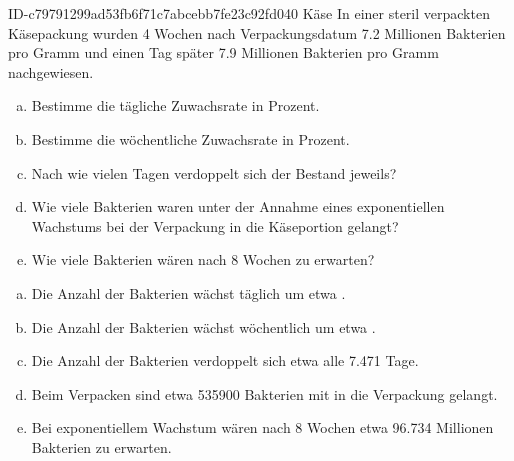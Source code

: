 \begin{exercise}
      {ID-c79791299ad53fb6f71c7abcebb7fe23c92fd040}
      {Käse}
  \ifproblem\problem
    In einer \glqq steril\grqq{} verpackten Käsepackung wurden
    4 Wochen nach Verpackungsdatum \num{7.2} Millionen
    Bakterien pro Gramm und einen Tag später \num{7.9} Millionen
    Bakterien pro Gramm nachgewiesen.
    \begin{enumerate}[a)]
      \item Bestimme die tägliche Zuwachsrate in Prozent.
      \item Bestimme die wöchentliche Zuwachsrate in Prozent.
      \item Nach wie vielen Tagen verdoppelt sich der Bestand jeweils?
      \item Wie viele Bakterien waren unter der Annahme eines
            exponentiellen Wachstums bei der Verpackung in die
            Käseportion gelangt?
      \item Wie viele Bakterien wären nach 8 Wochen zu erwarten?
    \end{enumerate}
  \fi
  \ifoutcome\outcome
    \begin{enumerate}[a)]
      \item Die Anzahl der Bakterien wächst täglich um etwa .
      \item Die Anzahl der Bakterien wächst wöchentlich um etwa .
      \item Die Anzahl der Bakterien verdoppelt sich etwa
            alle \num{7.471} Tage.
      \item Beim Verpacken sind etwa \num{535900} Bakterien mit
            in die Verpackung gelangt.
      \item Bei exponentiellem Wachstum wären nach 8
            Wochen etwa \num{96.734} Millionen Bakterien zu erwarten.
    \end{enumerate}
  \fi
\end{exercise}
